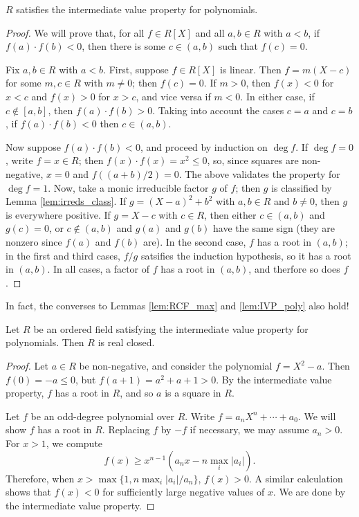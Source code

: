 \begin{lemma}
  \label{lem:IVP_poly}
  $R$ satisfies the intermediate value property for polynomials.
\end{lemma}
\begin{proof}
  We will prove that, for all $f\in R[X]$ and all $a,b\in R$ with $a<b$, if $f(a)\cdot f(b)<0$, then there is some $c\in(a,b)$ such that $f(c)=0$.

  Fix $a,b\in R$ with $a<b$. First, suppose $f\in R[X]$ is linear. Then $f=m(X-c)$ for some $m,c\in R$ with $m\neq0$; then $f(c)=0$. If $m>0$, then $f(x)<0$ for $x<c$ and $f(x)>0$ for $x>c$, and vice versa if $m<0$. In either case, if $c\notin[a,b]$, then $f(a)\cdot f(b)>0$. Taking into account the cases $c=a$ and $c=b$, if $f(a)\cdot f(b)<0$ then $c\in(a,b)$.

  Now suppose $f(a)\cdot f(b)<0$, and proceed by induction on $\deg f$. If $\deg f=0$, write $f=x\in R$; then $f(x)\cdot f(x)=x^2\leq 0$, so, since squares are non-negative, $x=0$ and $f((a+b)/2)=0$. The above validates the property for $\deg f=1$. Now, take a monic irreducible factor $g$ of $f$; then $g$ is classified by Lemma \ref{lem:irreds_class}. If $g=(X-a)^2+b^2$ with $a,b\in R$ and $b\neq0$, then $g$ is everywhere positive. If $g=X-c$ with $c\in R$, then either $c\in(a,b)$ and $g(c)=0$, or $c\notin(a,b)$ and $g(a)$ and $g(b)$ have the same sign (they are nonzero since $f(a)$ and $f(b)$ are). In the second case, $f$ has a root in $(a,b)$; in the first and third cases, $f/g$ satsifies the induction hypothesis, so it has a root in $(a,b)$. In all cases, a factor of $f$ has a root in $(a,b)$, and therfore so does $f$.
\end{proof}

In fact, the converses to Lemmas \ref{lem:RCF_max} and \ref{lem:IVP_poly} also hold!

\begin{theorem}
  \label{thm:IVP_poly_imp_RCF}
  Let $R$ be an ordered field satisfying the intermediate value property for polynomials. Then $R$ is real closed.
\end{theorem}
\begin{proof}
  Let $a\in R$ be non-negative, and consider the polynomial $f=X^2-a$. Then $f(0)=-a\leq0$, but $f(a+1)=a^2+a+1>0$. By the intermediate value property, $f$ has a root in $R$, and so $a$ is a square in $R$.

  Let $f$ be an odd-degree polynomial over $R$. Write $f=a_nX^n+\cdots+a_0$. We will show $f$ has a root in $R$. Replacing $f$ by $-f$ if necessary, we may assume $a_n>0$. For $x>1$, we compute
  \[f(x)\geq x^{n-1}(a_nx-n\max_i|a_i|).\]
  Therefore, when $x>\max\{1,n\max_i|a_i|/a_n\}$, $f(x)>0$. A similar calculation shows that $f(x)<0$ for sufficiently large negative values of $x$. We are done by the intermediate value property.
\end{proof}


